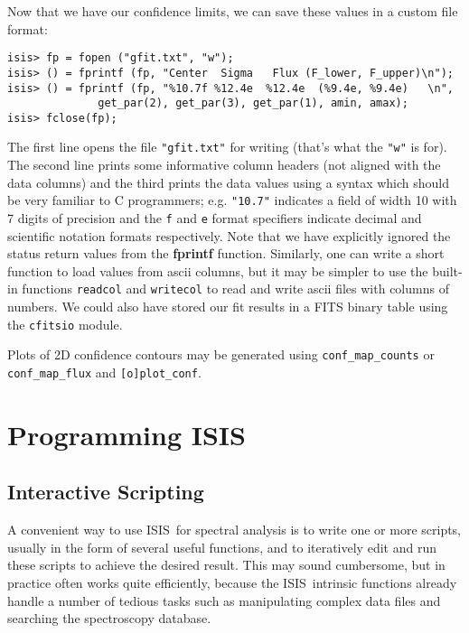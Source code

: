\documentclass{book}
\newcommand{\isisx}{{\sc ISIS~}}
\begin{document}
Now that we have our confidence limits, we can save these values
in a custom file format:
\begin{verbatim}
isis> fp = fopen ("gfit.txt", "w");
isis> () = fprintf (fp, "Center  Sigma   Flux (F_lower, F_upper)\n");
isis> () = fprintf (fp, "%10.7f %12.4e  %12.4e  (%9.4e, %9.4e)   \n",
              get_par(2), get_par(3), get_par(1), amin, amax);
isis> fclose(fp);
\end{verbatim}
The first line opens the file {\tt "gfit.txt"} for writing (that's
what the {\tt "w"} is for). The second line prints some
informative column headers (not aligned with the data columns) and
the third prints the data values using a syntax which should be
very familiar to C programmers; e.g. \verb|"10.7"| indicates a
field of width 10 with 7 digits of precision and the {\tt f} and
{\tt e} format specifiers indicate decimal and scientific notation
formats respectively.  Note that we have explicitly ignored the
status return values from the {\bf fprintf} function. Similarly,
one can write a short function to load values from ascii columns,
but it may be simpler to use the built-in functions \verb|readcol|
and \verb|writecol| to read and write ascii files with columns of
numbers. We could also have stored our fit results in a FITS
binary table using the \verb|cfitsio| module.\footnotemark


Plots of 2D confidence contours may be generated using
\verb|conf_map_counts| or \verb|conf_map_flux| and
\verb|[o]plot_conf|.

\chapter{Programming ISIS}
\label{chap:prog}

\section{Interactive Scripting}

A convenient way to use \isisx for spectral analysis is to write one or more
scripts, usually in the form of several useful functions, and to iteratively
edit and run these scripts to achieve the desired result. This may sound
cumbersome, but in practice often works quite efficiently, because the
\isisx intrinsic functions already handle a number of tedious tasks such as
manipulating complex data files and searching the spectroscopy database.
\end{document}

